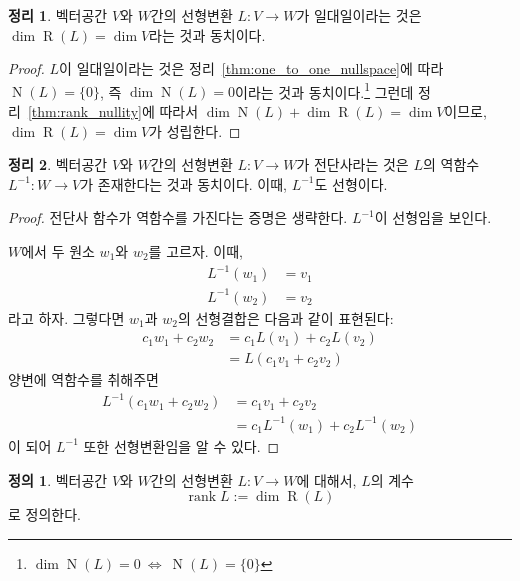 \documentclass[unfonts,oneside,a4paper]{oblivoir}
\theoremstyle{definition}
\newtheorem{definition}{정의}[section]
\theoremstyle{theorem}
\newtheorem{theorem}{정리}[section]
\theoremstyle{theorem}
\theoremstyle{remark}
\theoremstyle{remark}
\theoremstyle{remark}
\theoremstyle{remark}
\renewcommand{\vec}[1]{\bm{\mathit{#1}}}
\newcommand{\vecz}{\bm{\mathrm{0}}}
\DeclareMathOperator{\Null}{N}
\DeclareMathOperator{\Range}{R}
\DeclareMathOperator{\rank}{rank}
\begin{document}
\begin{theorem} \label{thm:one_to_one_range}
    벡터공간 $V$와 $W$간의 선형변환 $L: V \rightarrow W$가 일대일이라는 것은 $\dim \Range (L) = \dim V$라는 것과 동치이다.
\end{theorem}

\begin{proof}
    $L$이 일대일이라는 것은 정리~\ref{thm:one_to_one_nullspace}에 따라 $\Null (L) = \{\vecz\}$, 즉 $\dim \Null (L) = 0$이라는 것과 동치이다.\footnote{$\dim \Null (L) = 0\ \Leftrightarrow\ \Null (L) = \{\vecz\}$}
    그런데 정리~\ref{thm:rank_nullity}에 따라서 $\dim \Null (L) + \dim \Range (L) = \dim V$이므로, $\dim \Range(L) = \dim V$가 성립한다.
\end{proof}

\begin{theorem} \label{thm:inverse}
    벡터공간 $V$와 $W$간의 선형변환 $L: V \rightarrow W$가 전단사라는 것은 $L$의 역함수 $L^{-1}: W \rightarrow V$가 존재한다는 것과 동치이다.
    이때, $L^{-1}$도 선형이다.
\end{theorem}

\begin{proof}
    전단사 함수가 역함수를 가진다는 증명은 생략한다.
    $L^{-1}$이 선형임을 보인다.

    $W$에서 두 원소 $\vec w_1$와 $\vec w_2$를 고르자.
    이때,
    \begin{align*}
        L^{-1}(\vec w_1) &= \vec v_1\\
        L^{-1}(\vec w_2) &= \vec v_2
    \end{align*}
    라고 하자.
    그렇다면 $\vec w_1$과 $\vec w_2$의 선형결합은 다음과 같이 표현된다:
    \begin{align*}
        c_1 \vec w_1 + c_2 \vec w_2 &= c_1 L(\vec v_1) + c_2 L(\vec v_2)\\
                                &= L(c_1 \vec v_1 + c_2 \vec v_2)
    \end{align*}
    양변에 역함수를 취해주면
    \begin{align*}
        L^{-1}(c_1 \vec w_1 + c_2 \vec w_2) &= c_1 \vec v_1 + c_2 \vec v_2\\
                                     &= c_1 L^{-1}(\vec w_1) + c_2 L^{-1}(\vec w_2)
    \end{align*}
    이 되어 $L^{-1}$ 또한 선형변환임을 알 수 있다.
\end{proof}

\begin{definition}
    벡터공간 $V$와 $W$간의 선형변환 $L: V \rightarrow W$에 대해서, $L$의 계수
    \begin{equation*}
        \rank L := \dim \Range(L)
    \end{equation*}
    로 정의한다.
\end{definition}
\end{document}
